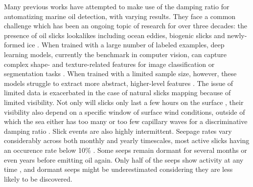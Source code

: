 \documentclass[journal]{IEEEtran}
\begin{document}
Many previous works have attempted to make use of the damping ratio for automatizing marine oil detection, with varying results. They face a common challenge which has been an ongoing topic of research for over 
three decades: the presence of oil slicks lookalikes including ocean eddies, biogenic slicks and newly-formed ice \cite{johanssonCanMineralOil2020,hovlandSlickDetectionSAR1994,alpersOilsSurfactants2004,
alpersOilSpillDetection2017,espedalSatelliteDetectionNatural1996}. 
When trained with a large number of labeled examples, deep learning models, currently the benchmark in computer vision, can capture complex shape- and texture-related features for image classification or 
segmentation tasks \cite{goodfellowDeepLearning2016}. When trained with a limited sample size, however, these models struggle to extract more abstract, higher-level features
\cite{bengioDeepLearningRepresentations2012}. The issue of limited data is exacerbated in the case of natural slicks mapping because of limited visibility. 
Not only will slicks only last a few hours on the surface \cite{jatiaultMonitoringNaturalOil2017,daneshgaraslHindcastModelingOil2017,oreillyDistributionMagnitudeVariability2022}, 
their visibility also depend on a specific window of surface wind conditions, outside of which the sea either has too many or too few capillary waves for a discriminative 
damping ratio \cite{quigleyInvestigationDampingRatio2023,sausDetectionDelineationProduced2021,gadeImagingBiogenicAnthropogenic1998}. 
\IEEEpubidadjcol  
Slick events are also highly intermittent. Seepage rates vary considerably across both monthly and yearly timescales, most active slicks having an occurence rate below 10\% 
\cite{jatiaultNaturalOilSeep2024,oreillyDistributionMagnitudeVariability2022}. Some seeps remain dormant for several months or even years before emitting oil again. Only half of the seeps show activity at any time 
\cite{jatiaultMonitoringNaturalOil2017,garcia-pinedaRemotesensingEvaluationGeophysical2010}, and dormant seeps might be underestimated considering they are less likely to be discovered.
\end{document}

